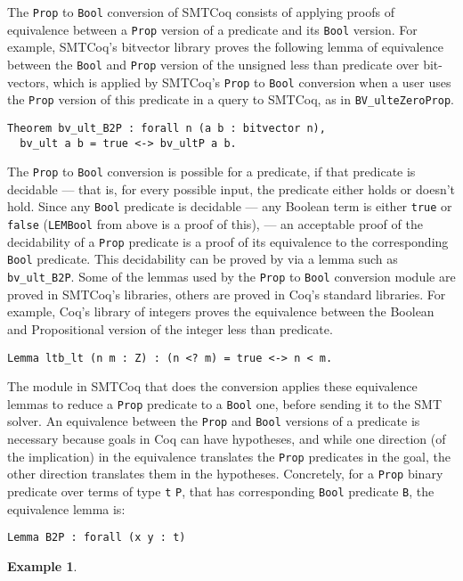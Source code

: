 \documentclass[11pt]{article}
\newtheorem{example}{Example}[section]
\begin{document}
	The	\texttt{Prop} to \texttt{Bool} 
	conversion of SMTCoq consists of 
	applying proofs of equivalence 
	between a \texttt{Prop} version
	of a predicate and its \texttt{Bool}
	version. For example, SMTCoq's 
	bitvector library proves the 
	following lemma of equivalence 
	between the \texttt{Bool}
	and \texttt{Prop} version of the 
	unsigned less than predicate over
	bit-vectors, which is applied 
	by SMTCoq's \texttt{Prop} to 
	\texttt{Bool} conversion when 
	a user uses the \texttt{Prop}
	version of this predicate in a 
	query to SMTCoq, as in 
	\texttt{BV\_ulteZeroProp}.
	\begin{verbatim}
Theorem bv_ult_B2P : forall n (a b : bitvector n), 
  bv_ult a b = true <-> bv_ultP a b.
	\end{verbatim}
	The \texttt{Prop} to \texttt{Bool}
	conversion is possible for a predicate, 
	if that predicate is decidable --- 
	that is, for every possible input, the 
	predicate either holds or doesn't 
	hold. Since any \texttt{Bool}
	predicate is decidable --- any Boolean 
	term is either \texttt{true}
	or \texttt{false} (\texttt{LEMBool}
	from above is a proof of this), ---
	an acceptable proof of the 
	decidability of a \texttt{Prop}
	predicate is a proof of its 
	equivalence to the corresponding
	\texttt{Bool} predicate.
	This decidability can be proved
	by via 
	a lemma such as \texttt{bv\_ult\_B2P}. 
	Some
	of the lemmas used by the 
	\texttt{Prop} to \texttt{Bool} 
	conversion module are proved in SMTCoq's
	libraries, others are proved in 
	Coq's standard libraries. For 
	example, Coq's library of integers
	proves the equivalence between the 
	Boolean and Propositional version 
	of the integer less than predicate.
	\begin{verbatim}
Lemma ltb_lt (n m : Z) : (n <? m) = true <-> n < m.
	\end{verbatim}
	The module in SMTCoq that does
	the conversion applies these 
	equivalence lemmas to reduce a 
	\texttt{Prop} predicate to a 
	\texttt{Bool} one, before sending 
	it to the SMT solver. An equivalence
	between the \texttt{Prop} and 
	\texttt{Bool} versions of a predicate
	is necessary because goals in Coq 
	can have hypotheses, and while 
	one direction (of the implication)
	in the equivalence
	translates the \texttt{Prop} 
	predicates in the goal, the 
	other direction translates them
	in the hypotheses. Concretely, 
	for a \texttt{Prop} binary predicate 
	over terms of type \texttt{t}
	\texttt{P}, that has corresponding
	\texttt{Bool} predicate \texttt{B},
	the equivalence lemma is:
	\begin{verbatim}
Lemma B2P : forall (x y : t)
	\end{verbatim}
	\begin{example}
	\end{example}
	


\end{document}
